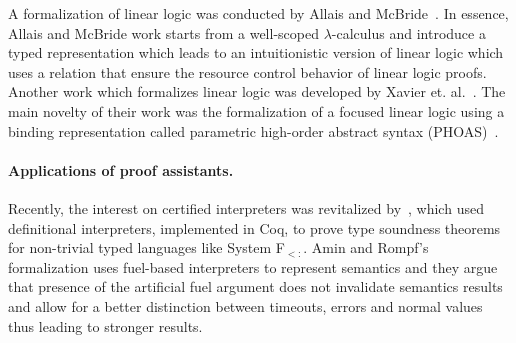A formalization of linear logic was conducted by Allais and McBride~\cite{allais18}. In essence, Allais and McBride work
starts from a well-scoped $\lambda$-calculus and introduce a typed representation which leads to an intuitionistic version
of linear logic which uses a relation that ensure the resource control behavior of linear logic proofs. Another work which
formalizes linear logic was developed by Xavier et. al.~\cite{xavier18}. The main novelty of their work was the formalization
of a focused linear logic using a binding representation called parametric high-order abstract syntax (PHOAS)~\cite{Chlipala08}.


\paragraph{Applications of proof assistants.}


Recently, the interest on certified interpreters was revitalized by~\citet{Amin17}, which used definitional
interpreters, implemented in Coq, to prove type soundness theorems for non-trivial typed languages like System F$_{<:}$.
Amin and Rompf's formalization uses fuel-based interpreters to represent semantics and they argue that presence of
the artificial fuel argument does not invalidate semantics results and allow for a better distinction between timeouts,
errors and normal values thus leading to stronger results.


